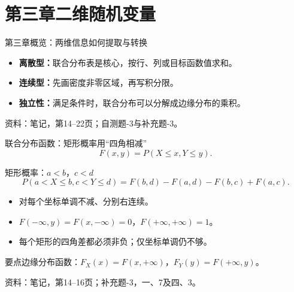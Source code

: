 \documentclass[aspectratio=169,10pt]{beamer}
\newcommand{\source}[1]{\vfill{\color{Muted}\fontsize{6.5}{8}\selectfont 资料：#1\par}}
\newcommand{\key}[1]{\begin{block}{要点}#1\end{block}}
\begin{document}
\section{第三章\quad 二维随机变量}

\begin{frame}[t]{第三章概览：两维信息如何提取与转换}
\begin{center}
\end{center}
\begin{itemize}
\item \textbf{离散型：}联合分布表是核心，按行、列或目标函数值求和。
\item \textbf{连续型：}先画密度非零区域，再写积分限。
\item \textbf{独立性：}满足条件时，联合分布可以分解成边缘分布的乘积。
\end{itemize}
\source{笔记，第14--22页；自测题-3与补充题-3。}
\end{frame}

\begin{frame}[t]{联合分布函数：矩形概率用“四角相减”}
\[
F(x,y)=P(X\le x,Y\le y).
\]
\begin{block}{矩形概率：$a<b$，$c<d$}
\[
\boxed{P(a<X\le b,c<Y\le d)=F(b,d)-F(a,d)-F(b,c)+F(a,c)}.
\]
\end{block}
\begin{itemize}
\item 对每个坐标单调不减、分别右连续。
\item $F(-\infty,y)=F(x,-\infty)=0$，$F(+\infty,+\infty)=1$。
\item 每个矩形的四角差都必须非负；仅坐标单调仍不够。
\end{itemize}
\key{边缘分布函数：$F_X(x)=F(x,+\infty)$，$F_Y(y)=F(+\infty,y)$。}
\source{笔记，第14--16页；补充题-3，一、7及四、3。}
\end{frame}
\end{document}
